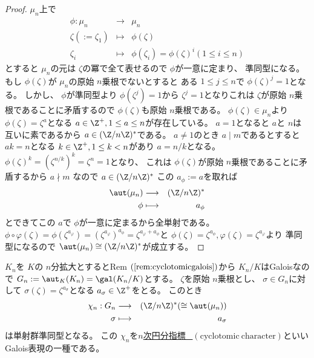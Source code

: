 \documentclass[../master_galois_theory]{subfiles}
\begin{document}
\begin{proof}
  $\mu_n$上で
  \begin{eqnarray*}
    \phi : \mu_n & \longrightarrow & \mu_n \\
    \zeta ( := \zeta_1) & \longmapsto & \phi(\zeta) \\
    \zeta_i & \longmapsto & \phi(\zeta_i) = \phi(\zeta)^i (1 \leq i \leq n)
  \end{eqnarray*}
  とすると $\mu_n$の元は $\zeta$の冪で全て表せるので $\phi$が一意に定まり、
  準同型になる。
  もし $\phi(\zeta)$が $\mu_n$の原始 $n$乗根でないとすると
  ある $ 1 \leq j \leq n$で $\phi(\zeta)^j = 1$となる。
  しかし、 $\phi$が準同型より $\phi(\zeta^j) = 1$から $\zeta^j = 1$となりこれは
  $\zeta$が原始 $n$乗根であることに矛盾するので $\phi(\zeta)$も原始 $n$乗根である。
  $\phi(\zeta) \in \mu_n$より $\phi(\zeta) = \zeta^a$となる $a \in \Z^+ , 1 \leq a \leq n$が存在している。
  $a = 1$となると $a$と $n$は互いに素であるから $a \in (\Z/n\Z)^*$である。
  $a \neq 1$のとき $a \mid m$であるとすると $ak = n$となる $k \in \Z^+ , 1 \leq k < n$があり $a = n/k$となる。
  $\phi(\zeta)^k = (\zeta^{n/k})^k = \zeta^n = 1$となり、
  これは $\phi(\zeta)$が原始 $n$乗根であることに矛盾するから $a \nmid m$
  なので $a \in (\Z/n\Z)^*$
  この $a_\phi := a$を取れば
  \begin{eqnarray*}
    \aut(\mu_n) & \longrightarrow & (\Z/n\Z)^* \\
    \phi & \longmapsto & a_\phi
  \end{eqnarray*}
  とできてこの $a$で $\phi$が一意に定まるから全単射である。
  $\phi \circ \varphi (\zeta) = \phi(\zeta^{a_\varphi}) = (\zeta^{a_\varphi})^{a_\phi} = \zeta^{a_\varphi + a_\phi}$と
  $\phi(\zeta) = \zeta^{a_\phi} , \varphi(\zeta) = \zeta^{a_\varphi}$より
  準同型になるので
  $\aut(\mu_n) \cong (\Z/n\Z)^*$が成立する。
\end{proof}

\begin{prop}
  $K_n$を $K$の $n$分拡大とすると\rm{Rem} $(\mathrm{\ref{rem:cyclotomicgalois}})$から $K_n/K$は\rm{Galois}なので
  $G_n := \aut_K(K_n) = \gal(K_n/K)$とする。
  $\zeta$を原始 $n$乗根とし、 $\sigma \in G_n$に対して
  $\sigma(\zeta) = \zeta^{a_\sigma}$となる $a_\sigma \in \Z^+$をとる。
  このとき
  \begin{eqnarray*}
    \chi_n : G_n & \longrightarrow & (\Z/n\Z)^* (\cong \aut(\mu_n)) \\
    \sigma & \longmapsto & a_\sigma
  \end{eqnarray*}
  は単射群準同型となる。
  この $\chi_n$を\underline{$n$次円分指標 \  $(\mathrm{cyclotomic \  character})$}といい\rm{Galois}表現の一種である。
\end{prop}
\end{document}
